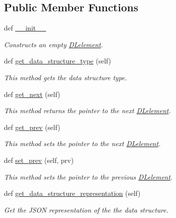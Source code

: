 \subsection*{Public Member Functions}
\begin{DoxyCompactItemize}
\item 
def \hyperlink{class_bridges_1_1dl__element_1_1_d_lelement_aeff7357e381b47df4ca8393b0ab58fd0}{\+\_\+\+\_\+init\+\_\+\+\_\+}
\begin{DoxyCompactList}\small\item\em Constructs an empty \hyperlink{class_bridges_1_1dl__element_1_1_d_lelement}{D\+Lelement}. \end{DoxyCompactList}\item 
def \hyperlink{class_bridges_1_1dl__element_1_1_d_lelement_a8e58440740696b00b0fbf466311a2e82}{get\+\_\+data\+\_\+structure\+\_\+type} (self)
\begin{DoxyCompactList}\small\item\em This method gets the data structure type. \end{DoxyCompactList}\item 
def \hyperlink{class_bridges_1_1dl__element_1_1_d_lelement_a494dbc772c5be2fedc1543c33ff18773}{get\+\_\+next} (self)
\begin{DoxyCompactList}\small\item\em This method returns the pointer to the next \hyperlink{class_bridges_1_1dl__element_1_1_d_lelement}{D\+Lelement}. \end{DoxyCompactList}\item 
def \hyperlink{class_bridges_1_1dl__element_1_1_d_lelement_ab3a51eae57870b6b45b09b8810d9b22b}{get\+\_\+prev} (self)
\begin{DoxyCompactList}\small\item\em This method sets the pointer to the next \hyperlink{class_bridges_1_1dl__element_1_1_d_lelement}{D\+Lelement}. \end{DoxyCompactList}\item 
def \hyperlink{class_bridges_1_1dl__element_1_1_d_lelement_a5a1281ba8e5d39551f6b0628b28cdda2}{set\+\_\+prev} (self, prv)
\begin{DoxyCompactList}\small\item\em This method sets the pointer to the previous \hyperlink{class_bridges_1_1dl__element_1_1_d_lelement}{D\+Lelement}. \end{DoxyCompactList}\item 
def \hyperlink{class_bridges_1_1dl__element_1_1_d_lelement_ab2019529a20633a852a06221b11776c9}{get\+\_\+data\+\_\+structure\+\_\+representation} (self)
\begin{DoxyCompactList}\small\item\em Get the J\+S\+O\+N representation of the the data structure. \end{DoxyCompactList}\end{DoxyCompactItemize}
